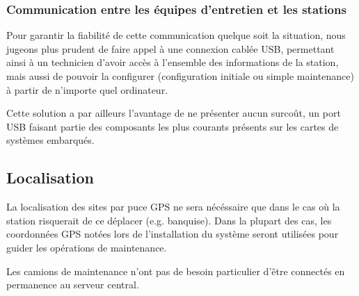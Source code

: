 \subsubsection{Communication entre les équipes d'entretien et les stations}

Pour garantir la fiabilité de cette communication quelque soit la situation, nous jugeons plus prudent de faire appel à une connexion cablée USB, permettant ainsi à un technicien d'avoir accès à l'ensemble des informations de la station, mais aussi de pouvoir la configurer (configuration initiale ou simple maintenance) à partir de n'importe quel ordinateur.

Cette solution a par ailleurs l'avantage de ne présenter aucun surcoût, un port USB faisant partie des composants les plus courants présents sur les cartes de systèmes embarqués.

\subsection{Localisation}

La localisation des sites par puce GPS ne sera nécéssaire que dans le cas où la station risquerait de ce déplacer (e.g. banquise). Dans la plupart des cas, les coordonnées GPS notées lors de l'installation du système seront utilisées pour guider les opérations de maintenance.

Les camions de maintenance n'ont pas de besoin particulier d'être connectés en permanence au serveur central.


	 	

